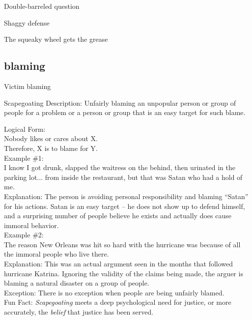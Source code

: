 \documentclass[a4paper,12pt,single,pdftex]{scrartcl}
\begin{document}
  

Double-barreled question

Shaggy defense

The squeaky wheel gets the grease\subsection{blaming}


Victim blaming

Scapegoating
    Description: Unfairly blaming an unpopular person or group of people for a problem or a person or group that is an easy target for such blame.

    
      Logical Form:
    \\

    
      Nobody likes or cares about X.
    \\

    
      Therefore, X is to blame for Y.
    \\

    
      Example \#1:
    \\

    
      I know I got drunk, slapped the waitress on the behind, then urinated in the parking lot... from inside the restaurant, but that was Satan who had a hold of me.
    \\

    
      Explanation: The person is avoiding personal responsibility and blaming “Satan” for his actions.  Satan is an easy target -- he does not show up to defend himself, and a surprising number of people believe he exists and actually does cause immoral behavior.
    \\

    
      Example \#2:
    \\

    
      The reason New Orleans was hit so hard with the hurricane was because of all the immoral people who live there.
    \\

    
      Explanation: This was an actual argument seen in the months that followed hurricane Katrina.  Ignoring the validity of the claims being made, the arguer is blaming a natural disaster on a group of people.
    \\

    
      Exception: There is no exception when people are being unfairly blamed.
    \\

    
      Fun Fact: {\em Scapegoating} meets a deep psychological need for justice, or more accurately, the {\em belief} that justice has been served.
    \\
\end{document}
